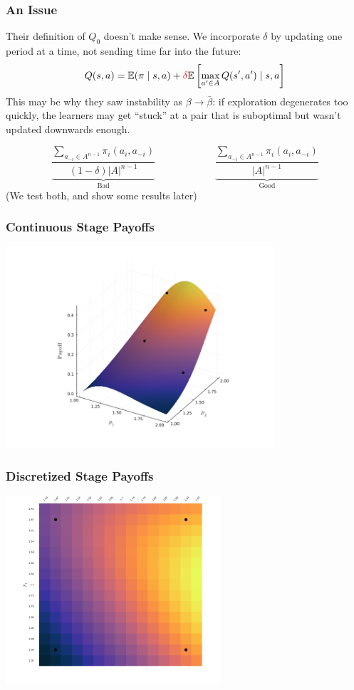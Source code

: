 \documentclass{beamer}
\begin{document}
\begin{frame}\frametitle{An Issue}
	Their definition of $Q_0$ doesn't make sense. We incorporate $\delta$ by updating one period at a time, not sending time far into the future: \[Q(s,a) = \mathbb{E}(\pi \mid s,a) + \textcolor{red}{\delta} \mathbb{E}\left[ \max_{a'\in A} Q(s',a') \mid s,a\right]\]
	This may be why they saw instability as $\beta \to \bar{\beta}$: if exploration degenerates too quickly, the learners may get ``stuck'' at a pair that is suboptimal but wasn't updated downwards enough. 
	
	\[
	\underbrace{\frac{\sum_{a_{-i} \in A^{n-1}}\pi_i(a_i,a_{-i})}{(1-\delta) |A|^{n-1}}}_{\text{Bad}} \qquad\qquad \qquad \underbrace{\frac{\sum_{a_{-i} \in A^{n-1}}\pi_i(a_i,a_{-i})}{ |A|^{n-1}}}_\text{Good}
	\]
	(We test both, and show some results later)
\end{frame}
\begin{frame}\frametitle{Continuous Stage Payoffs}
\centering
	\includegraphics[width=10cm]{cont_plot.png}
\end{frame}
\begin{frame}\frametitle{Discretized Stage Payoffs}
\centering
	\includegraphics[width=8cm]{heatmap_plot.png}
\end{frame}
\end{document}
